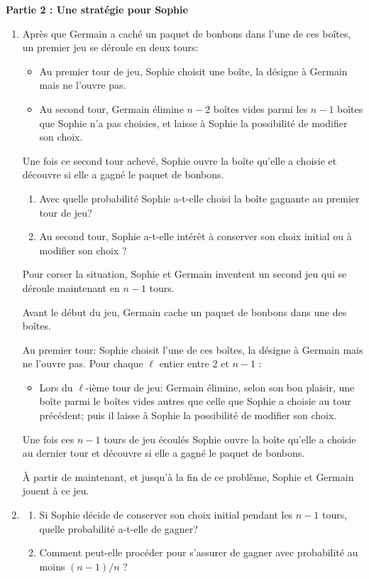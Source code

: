 \documentclass[landscape,twocolumn,leqno,a4paper,10pt]{report} %
\renewcommand{\textbf}[1]{\begingroup\bfseries\mathversion{bold}#1\endgroup}		%
\begin{document}
\bigskip
\begin{center}
\textbf{Partie 2 : Une stratégie pour Sophie}\end{center}

\begin{enumerate}[resume]
\item  Après que Germain a caché un paquet de bonbons dans l'une de ces boîtes, un premier jeu se déroule en deux tours:

\begin{itemize}
\item Au premier tour de jeu, Sophie choisit une boîte, la désigne à Germain mais ne l'ouvre pas.
\item Au second tour, Germain élimine $n - 2$ boîtes vides parmi les $n -1$ boîtes que Sophie n'a pas choisies, et laisse à Sophie la possibilité de modifier son choix.
\end{itemize}

Une fois ce second tour achevé, Sophie ouvre la boîte qu'elle a choisie et découvre si elle a gagné le paquet de bonbons.

	\begin{enumerate}
		\item Avec quelle probabilité Sophie a-t-elle choisi la boîte gagnante au premier tour de jeu?
		\item Au second tour, Sophie a-t-elle intérêt à conserver son choix initial ou à modifier son choix ?
	\end{enumerate}
		
Pour corser la situation, Sophie et Germain inventent un second jeu qui se déroule maintenant en $n - 1$ tours.

Avant le début du jeu, Germain cache un paquet de bonbons dans une des boîtes.

Au premier tour: Sophie choisit l'une de ces boîtes, la désigne à Germain mais ne l'ouvre pas. Pour chaque $\ell$ entier entre 2 et $n - 1$ :

\begin{itemize}
\item Lors du $\ell$-ième tour de jeu: Germain élimine, selon son bon plaisir, une boîte parmi le boîtes vides autres que celle que Sophie a choisie au tour précédent; puis il laisse à Sophie la possibilité de modifier son choix.
\end{itemize}

Une fois ces $n -1$ tours de jeu écoulés Sophie ouvre la boîte qu'elle a choisie au dernier tour et découvre si elle a gagné le paquet de bonbons.

À partir de maintenant, et jusqu'à la fin de ce problème, Sophie et Germain jouent à ce jeu.

\item 
	\begin{enumerate}
		\item Si Sophie décide de conserver son choix initial pendant les $n -1$ tours, quelle probabilité a-t-elle de gagner?
		\item Comment peut-elle procéder pour s'assurer de gagner avec probabilité au moins $(n -1)/ n$ ?
	\end{enumerate}
\end{enumerate}
\end{document}
